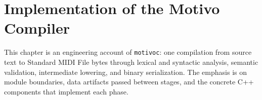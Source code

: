 \chapter{Implementation of the Motivo Compiler}\label{ch:compiler-implementation}

This chapter is an engineering account of \texttt{motivoc}: one compilation from source text to Standard MIDI File bytes
through lexical and syntactic analysis, semantic validation, intermediate lowering, and binary serialization.
The emphasis is on module boundaries, data artifacts passed between stages, and the concrete C++ components that
implement each phase.







